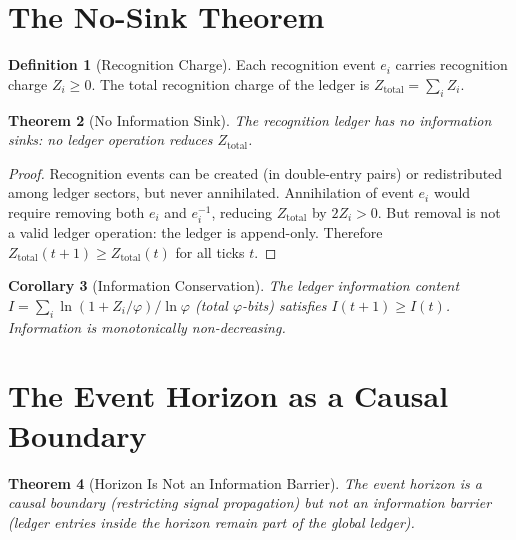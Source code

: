 \documentclass[12pt,a4paper]{article}
\newtheorem{theorem}{Theorem}[section]
\newtheorem{corollary}[theorem]{Corollary}
\theoremstyle{definition}
\newtheorem{definition}[theorem]{Definition}
\theoremstyle{remark}
\begin{document}
\section{The No-Sink Theorem}
\label{sec:nosink}

\begin{definition}[Recognition Charge]
Each recognition event $e_i$ carries recognition charge
$Z_i \geq 0$.  The total recognition charge of the ledger is
$Z_{\mathrm{total}} = \sum_i Z_i$.
\end{definition}

\begin{theorem}[No Information Sink]
\label{thm:nosink}
The recognition ledger has no information sinks: no ledger
operation reduces $Z_{\mathrm{total}}$.
\end{theorem}

\begin{proof}
Recognition events can be created (in double-entry pairs) or
redistributed among ledger sectors, but never annihilated.
Annihilation of event $e_i$ would require removing both $e_i$
and $e_i^{-1}$, reducing $Z_{\mathrm{total}}$ by $2Z_i > 0$.
But removal is not a valid ledger operation: the ledger is
append-only.  Therefore
$Z_{\mathrm{total}}(t+1) \geq Z_{\mathrm{total}}(t)$ for all
ticks $t$.
\end{proof}

\begin{corollary}[Information Conservation]
\label{cor:info}
The ledger information content
$I = \sum_i \ln(1 + Z_i/\varphi)/\ln\varphi$ (total
$\varphi$-bits) satisfies $I(t+1) \geq I(t)$.  Information is
monotonically non-decreasing.
\end{corollary}

\section{The Event Horizon as a Causal Boundary}
\label{sec:horizon}

\begin{theorem}[Horizon Is Not an Information Barrier]
\label{thm:horizon}
The event horizon is a causal boundary (restricting signal
propagation) but not an information barrier (ledger entries inside
the horizon remain part of the global ledger).
\end{theorem}
\end{document}
